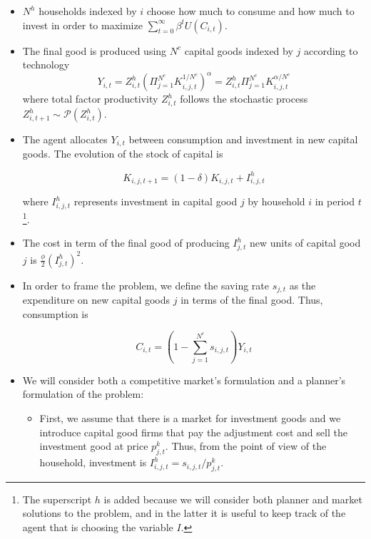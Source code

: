 \documentclass[11pt,english]{article}
\begin{document}
\begin{itemize}
	\item $N^h$ households indexed by $i$ choose how much to consume and how much to invest in order to maximize $\sum_{t=0}^{\infty} \beta^t U(C_{i,t})$.\medskip
	
	\item The final good is produced using $N^c$ capital goods indexed by $j$ according to technology $$Y_{i,t}=Z^h_{i,t} \left(\Pi_{j=1}^{N^c} K_{i,j,t}^{1/N^c} \right)^{\alpha} = Z^h_{i,t} \Pi_{j=1}^{N^c} K_{i,j,t}^{\alpha/N^c}$$  where total factor productivity $Z^h_{i,t}$ follows the stochastic process $Z^h_{i,t+1} \sim \mathcal P(Z^h_{i,t})$. \medskip
	
	\item The agent allocates $Y_{i,t}$ between consumption and investment in new capital goods. The evolution of the stock of capital is 
	
	$$K_{i,j,t+1} = (1-\delta) K_{i,j,t} + I^h_{i,j,t}$$ 
	
	where $I^h_{i,j,t}$ represents investment in capital good $j$ by household $i$ in period $t$\footnote{The superscript $h$ is added because we will consider both planner and market solutions to the problem, and in the latter it is useful to keep track of the agent that is choosing the variable $I$.}. 
	
	\item The cost in term of the final good of  producing $I^h_{j,t}$ new units of capital good $j$  is $\frac{\phi}{2} \left(I^h_{j,t}\right)^2$.  \medskip
	
	\item In order to frame the problem, we define the saving rate $s_{j,t}$ as the expenditure on new capital goods $j$ in terms of the final good. Thus, consumption is 
	
	$$C_{i,t}=(1-\sum_{j=1}^{N^c} s_{i,j,t})Y_{i,t}$$ 
	
	\item We will consider both a competitive market's formulation and a planner's formulation of the problem: 
	
	\begin{itemize}
		\item First, we assume that there is a market for investment goods and we introduce capital good firms that pay the adjustment cost and sell the investment good at price $p^k_{j,t}$. Thus, from the point of view of the household, investment is $I^h_{i,j,t} = s_{i,j,t}/p^k_{j,t}$.   \medskip
		

\end{itemize}
\end{itemize}
\end{document}
